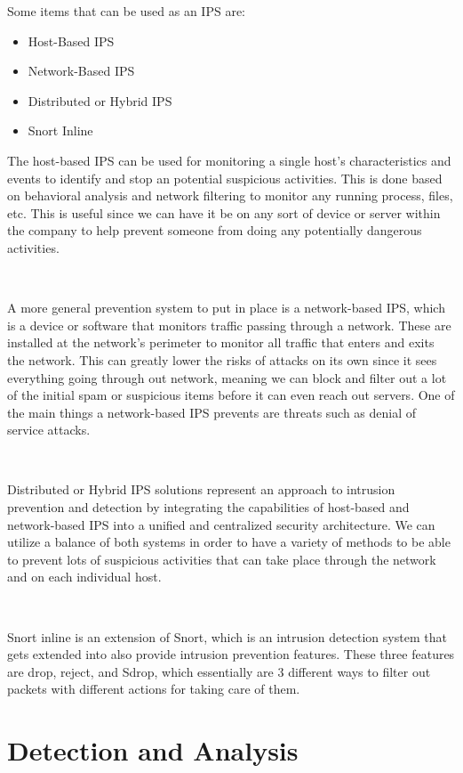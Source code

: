 \documentclass[12pt,a4paper]{report}
\begin{document}
\pagebreak %

\noindent
Some items that can be used as an IPS are:
\begin{itemize}
 \item Host-Based IPS
 \item Network-Based IPS
 \item Distributed or Hybrid IPS
 \item Snort Inline
\end{itemize}

The host-based IPS can be used for monitoring a single host's characteristics and events to identify and stop an potential suspicious activities.
This is done based on behavioral analysis and network filtering to monitor any running process, files, etc.
This is useful since we can have it be on any sort of device or server within the company to help prevent someone from doing any potentially dangerous activities.

\

A more general prevention system to put in place is a network-based IPS, which is a device or software that monitors traffic passing through a network. 
These are installed at the network's perimeter to monitor all traffic that enters and exits the network. 
This can greatly lower the risks of attacks on its own since it sees everything going through out network, meaning we can block and filter out a lot of the initial spam or suspicious items before it can even reach out servers.
One of the main things a network-based IPS prevents are threats such as denial of service attacks. 

\

Distributed or Hybrid IPS solutions represent an approach to intrusion prevention and detection by integrating the capabilities of host-based and network-based IPS into a unified and centralized security architecture.
We can utilize a balance of both systems in order to have a variety of methods to be able to prevent lots of suspicious activities that can take place through the network and on each individual host.

\

Snort inline is an extension of Snort, which is an intrusion detection system that gets extended into also provide intrusion prevention features.
These three features are drop, reject, and Sdrop, which essentially are 3 different ways to filter out packets with different actions for taking care of them.

\section{Detection and Analysis}
\
\end{document}
